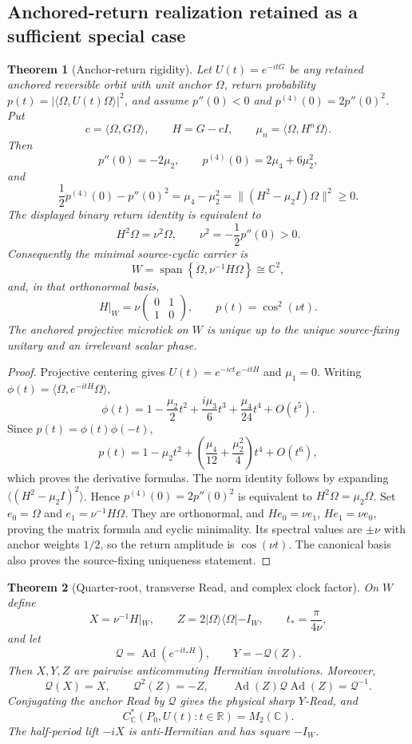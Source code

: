 \documentclass[11pt]{article}
\newtheorem{theorem}{Theorem}[section]
\theoremstyle{definition}
\theoremstyle{remark}
\newcommand{\R}{\mathbb R}
\newcommand{\C}{\mathbb C}
\newcommand{\Ad}{\operatorname{Ad}}
\newcommand{\Span}{\operatorname{span}}
\begin{document}
\subsection{Anchored-return realization retained as a sufficient special case}


\begin{theorem}[Anchor-return rigidity]
\label{thm:anchor-return-rigidity-master}
Let $U(t)=e^{-itG}$ be any retained anchored reversible orbit with unit anchor
$\Omega$, return probability $p(t)=|\langle\Omega,U(t)\Omega\rangle|^2$,
and assume $p''(0)<0$ and $p^{(4)}(0)=2p''(0)^2$.  Put
\[
 c=\langle\Omega,G\Omega\rangle,
 \qquad H=G-cI,
 \qquad \mu_n=\langle\Omega,H^n\Omega\rangle.
\]
Then
\[
 p''(0)=-2\mu_2,
 \qquad
 p^{(4)}(0)=2\mu_4+6\mu_2^2,
\]
and
\[
 \boxed{
 \frac12p^{(4)}(0)-p''(0)^2
 =\mu_4-\mu_2^2
 =\|(H^2-\mu_2I)\Omega\|^2\ge0.}
\]
The displayed binary return identity is equivalent to
\[
 H^2\Omega=\nu^2\Omega,
 \qquad
 \nu^2=-\frac12p''(0)>0.
\]
Consequently the minimal source-cyclic carrier is
\[
 W=\Span\left\{\Omega,\nu^{-1}H\Omega\right\}\cong\C^2,
\]
and, in that orthonormal basis,
\[
 H|_W=\nu
 \begin{pmatrix}0&1\\1&0\end{pmatrix},
 \qquad
 \boxed{p(t)=\cos^2(\nu t).}
\]
The anchored projective microtick on $W$ is unique up to the unique
source-fixing unitary and an irrelevant scalar phase.
\end{theorem}

\begin{proof}
Projective centering gives
$U(t)=e^{-ict}e^{-itH}$ and $\mu_1=0$.  Writing
$\phi(t)=\langle\Omega,e^{-itH}\Omega\rangle$,
\[
 \phi(t)=1-\frac{\mu_2}{2}t^2
 +\frac{i\mu_3}{6}t^3+\frac{\mu_4}{24}t^4+O(t^5).
\]
Since $p(t)=\phi(t)\phi(-t)$,
\[
 p(t)=1-\mu_2t^2
 +\left(\frac{\mu_4}{12}+\frac{\mu_2^2}{4}\right)t^4
 +O(t^6),
\]
which proves the derivative formulas.  The norm identity follows by expanding
$\langle(H^2-\mu_2I)^2\rangle$.  Hence
$p^{(4)}(0)=2p''(0)^2$ is equivalent to
$H^2\Omega=\mu_2\Omega$.  Set $e_0=\Omega$ and
$e_1=\nu^{-1}H\Omega$.  They are orthonormal, and
$He_0=\nu e_1$, $He_1=\nu e_0$, proving the matrix formula and cyclic
minimality.  Its spectral values are $\pm\nu$ with anchor weights $1/2$, so
the return amplitude is $\cos(\nu t)$.  The canonical basis also proves the
source-fixing uniqueness statement.
\end{proof}

\begin{theorem}[Quarter-root, transverse Read, and complex clock factor]
\label{thm:clock-quarter-root-master}
On $W$ define
\[
 X=\nu^{-1}H|_W,
 \qquad
 Z=2|\Omega\rangle\langle\Omega|-I_W,
 \qquad
 t_*=\frac{\pi}{4\nu},
\]
and let
\[
 \mathcal Q=\Ad(e^{-it_*H}),
 \qquad
 Y=-\mathcal Q(Z).
\]
Then $X,Y,Z$ are pairwise anticommuting Hermitian involutions.  Moreover,
\[
 \mathcal Q(X)=X,
 \qquad
 \mathcal Q^2(Z)=-Z,
 \qquad
 \Ad(Z)\mathcal Q\Ad(Z)=\mathcal Q^{-1}.
\]
Conjugating the anchor Read by $\mathcal Q$ gives the physical sharp
$Y$-Read, and
\[
 \boxed{C^*_{\C}(P_0,U(t):t\in\R)=M_2(\C).}
\]
The half-period lift $-iX$ is anti-Hermitian and has square $-I_W$.
\end{theorem}
\end{document}
